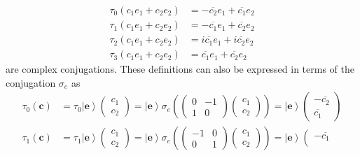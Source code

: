\documentclass[aps,preprint]{revtex4}
\begin{document}
\begin{align}
\tau_{0}\left( c_{1}e_{1}+c_{2}e_{2}\right) & =-\overline{c_{2}}e_{1}+%
\overline{c_{1}}e_{2} \\
\tau_{1}\left( c_{1}e_{1}+c_{2}e_{2}\right) & =-\overline{c_{1}}e_{1}+%
\overline{c_{2}}e_{2} \\
\tau_{2}\left( c_{1}e_{1}+c_{2}e_{2}\right) & =i\overline{c_{1}}e_{1}+i%
\overline{c_{2}}e_{2} \\
\tau_{3}\left( c_{1}e_{1}+c_{2}e_{2}\right) & =\overline{c_{1}}e_{1}+%
\overline{c_{2}}e_{2}
\end{align}
are complex conjugations. These definitions can also be expressed in terms
of the conjugation $\sigma_{e}$ as 
\begin{align}
\tau_{0}\left( \mathbf{c}\right) & =\tau_{0}\left\vert \mathbf{e}%
\right\rangle \left( 
\begin{array}{c}
c_{1} \\ 
c_{2}%
\end{array}
\right) =\left\vert \mathbf{e}\right\rangle \sigma_{e}\left( \left( 
\begin{array}{cc}
0 & -1 \\ 
1 & 0%
\end{array}
\right) \left( 
\begin{array}{c}
c_{1} \\ 
c_{2}%
\end{array}
\right) \right) =\left\vert \mathbf{e}\right\rangle \left( 
\begin{array}{c}
-\overline{c_{2}} \\ 
\overline{c_{1}}%
\end{array}
\right) \\
\tau_{1}\left( \mathbf{c}\right) & =\tau_{1}\left\vert \mathbf{e}%
\right\rangle \left( 
\begin{array}{c}
c_{1} \\ 
c_{2}%
\end{array}
\right) =\left\vert \mathbf{e}\right\rangle \sigma_{e}\left( \left( 
\begin{array}{cc}
-1 & 0 \\ 
0 & 1%
\end{array}
\right) \left( 
\begin{array}{c}
c_{1} \\ 
c_{2}%
\end{array}
\right) \right) =\left\vert \mathbf{e}\right\rangle \left( 
\begin{array}{c}
-\overline{c_{1}} \\ 

\end{array}
\end{align}
\end{document}
